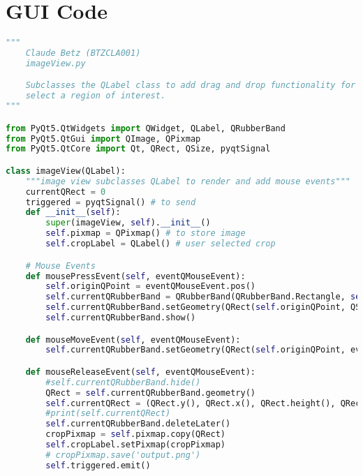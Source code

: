 \section{GUI Code}
\begin{lstlisting}[language=Python, caption={QLabel Mouse Event Code}, captionpos=b, label={lst:gui}]
"""
    Claude Betz (BTZCLA001)
    imageView.py

    Subclasses the QLabel class to add drag and drop functionality for a User to
    select a region of interest.
"""

from PyQt5.QtWidgets import QWidget, QLabel, QRubberBand
from PyQt5.QtGui import QImage, QPixmap
from PyQt5.QtCore import Qt, QRect, QSize, pyqtSignal

class imageView(QLabel):
    """image view subclasses QLabel to render and add mouse events"""
    currentQRect = 0
    triggered = pyqtSignal() # to send
    def __init__(self):
        super(imageView, self).__init__()
        self.pixmap = QPixmap() # to store image
        self.cropLabel = QLabel() # user selected crop

    # Mouse Events
    def mousePressEvent(self, eventQMouseEvent):
        self.originQPoint = eventQMouseEvent.pos()
        self.currentQRubberBand = QRubberBand(QRubberBand.Rectangle, self)
        self.currentQRubberBand.setGeometry(QRect(self.originQPoint, QSize()))
        self.currentQRubberBand.show()

    def mouseMoveEvent(self, eventQMouseEvent):
        self.currentQRubberBand.setGeometry(QRect(self.originQPoint, eventQMouseEvent.pos()).normalized())

    def mouseReleaseEvent(self, eventQMouseEvent):
        #self.currentQRubberBand.hide()
        QRect = self.currentQRubberBand.geometry()
        self.currentQRect = (QRect.y(), QRect.x(), QRect.height(), QRect.width())
        #print(self.currentQRect)
        self.currentQRubberBand.deleteLater()
        cropPixmap = self.pixmap.copy(QRect)
        self.cropLabel.setPixmap(cropPixmap)
        # cropPixmap.save('output.png')
        self.triggered.emit()
\end{lstlisting}



